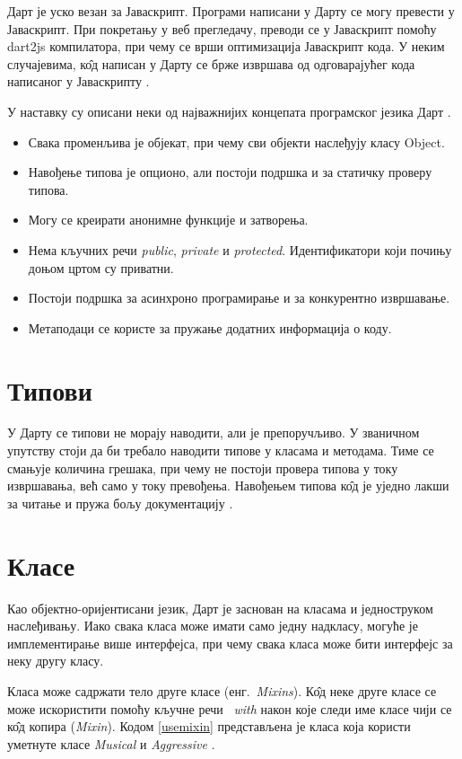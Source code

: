 \documentclass[12pt,oneside]{memoir}
\begin{document}
Дарт је уско везан за Јаваскрипт. Програми написани у Дарту се могу превести у Јаваскрипт. При покретању у веб прегледачу, преводи се у Јаваскрипт помоћу dart2js компилатора, при чему се врши оптимизација Јаваскрипт кода. У неким случајевима, к\^{о}д написан у Дарту се брже извршава од одговарајућег кода написаног у Јаваскрипту \cite{dart, dart1}.

У наставку су описани неки од најважнијих концепата програмског језика Дарт \cite{dart, dart1}.
\begin{itemize}
\item Свака променљива је објекат, при чему сви објекти наслеђују класу Object.
\item Навођење типова је опционо, али постоји подршка и за статичку проверу типова.
\item Могу се креирати анонимне функције и затворења.
\item Нема кључних речи \textit{public}, \textit{private} и \textit{protected}. Идентификатори који почињу доњом цртом су приватни.
\item Постоји подршка за асинхроно програмирање и за конкурентно извршавање.
\item Метаподаци се користе за пружање додатних информација о коду.
\end{itemize}

\section{Типови}
\label{tipovi}

У Дарту се типови не морају наводити, али је препоручљиво. У званичном упутству стоји да би требало наводити типове у класама и методама. Тиме се смањује количина грешака, при чему не постоји провера типова у току извршавања, већ само у току превођења. Навођењем типова к\^{о}д је уједно лакши за читање и пружа бољу документацију \cite{dart, dart1}. 

\section{Класе}
\label{klase}
Као објектно-оријентисани језик, Дарт је заснован на класама и једноструком наслеђивању. Иако свака класа може имати само једну надкласу, могуће је имплементирање више интерфејса, при чему свака класа може бити интерфејс за неку другу класу. 

Класа може садржати тело друге класе (енг.~\textit{Mixins}). К\^{о}д неке друге класе се може искористити помоћу кључне речи ~\textit{with} након које следи име класе чији се к\^{о}д копира (\textit{Mixin}). Кодом \ref{usemixin} представљена је класа која користи уметнуте класе \textit{Musical} и \textit{Aggressive} \cite{dart, dart1}.
\end{document}
